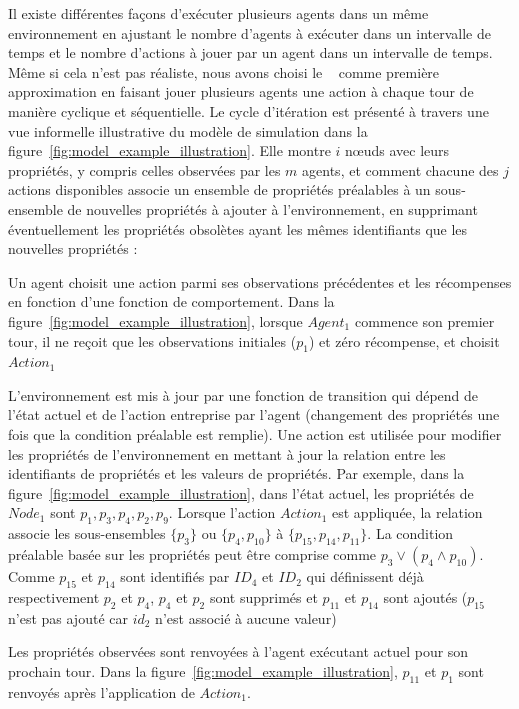 Il existe différentes façons d'exécuter plusieurs agents dans un même environnement en ajustant le nombre d'agents à exécuter dans un intervalle de temps et le nombre d'actions à jouer par un agent dans un intervalle de temps. Même si cela n'est pas réaliste, nous avons choisi le ~\cite{jk2020} comme première approximation en faisant jouer plusieurs agents une action à chaque tour de manière cyclique et séquentielle. Le cycle d'itération est présenté à travers une vue informelle illustrative du modèle de simulation dans la figure~\ref{fig:model_example_illustration}. Elle montre $i$ nœuds avec leurs propriétés, y compris celles observées par les $m$ agents, et comment chacune des $j$ actions disponibles associe un ensemble de propriétés préalables à un sous-ensemble de nouvelles propriétés à ajouter à l'environnement, en supprimant éventuellement les propriétés obsolètes ayant les mêmes identifiants que les nouvelles propriétés : \begin{enumerate*}[label=\arabic*),itemjoin={;\quad}]     
    \item Un agent choisit une action parmi ses observations précédentes et les récompenses en fonction d'une fonction de comportement. Dans la figure~\ref{fig:model_example_illustration}, lorsque $Agent_1$ commence son premier tour, il ne reçoit que les observations initiales ($p_{1}$) et zéro récompense, et choisit $Action_1$


    
    \item L'environnement est mis à jour par une fonction de transition qui dépend de l'état actuel et de l'action entreprise par l'agent (changement des propriétés une fois que la condition préalable est remplie). Une action est utilisée pour modifier les propriétés de l'environnement en mettant à jour la relation entre les identifiants de propriétés et les valeurs de propriétés.
    Par exemple, dans la figure~\ref{fig:model_example_illustration}, dans l'état actuel, les propriétés de $Node_1$ sont $p_1,p_3,p_4,p_2,p_9$. Lorsque l'action $Action_1$ est appliquée, la relation associe les sous-ensembles $\{p_3\}$ ou $\{p_4, \allowbreak p_{10}\}$ à $\{p_{15}, \allowbreak p_{14}, \allowbreak p_{11}\}$. La condition préalable basée sur les propriétés peut être comprise comme $p_3 \lor (p_4 \land p_{10})$. Comme $p_{15}$ et $p_{14}$ sont identifiés par $ID_4$ et $ID_2$ qui définissent déjà respectivement $p_{2}$ et $p_{4}$, $p_{4}$ et $p_{2}$ sont supprimés et $p_{11}$ et $p_{14}$ sont ajoutés ($p_{15}$ n'est pas ajouté car $id_2$ n'est associé à aucune valeur)


    
    \item Les propriétés observées sont renvoyées à l'agent exécutant actuel pour son prochain tour. Dans la figure~\ref{fig:model_example_illustration}, $p_{11}$ et $p_1$ sont renvoyés après l'application de $Action_1$.

\end{enumerate*}

